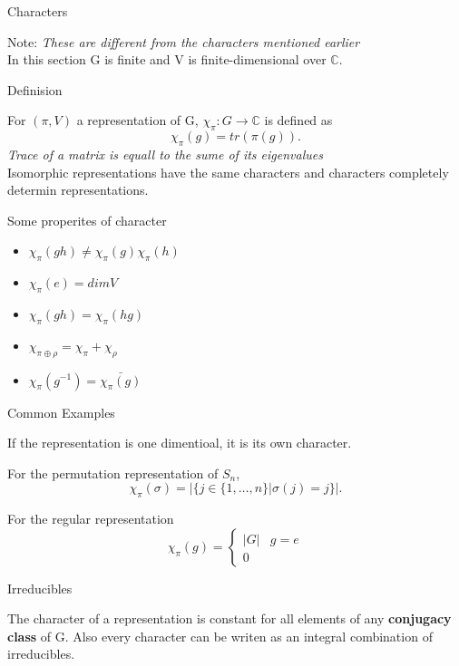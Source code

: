 \documentclass[12pt, letterpaper]{article}
\newcommand{\C}{\mathbb{C}}
\begin{document}
\begin{section}{Characters}

  Note: \emph{These are different from the characters mentioned earlier} \\
  In this section G is finite and V is finite-dimensional over \(\C\).

  \begin{subsection}{Definision}

    For \((\pi, V)\) a representation of G, \(\chi_{\pi}: G \to \C\) is defined
    as \[\chi_{\pi}(g) = tr(\pi(g)).\] \emph{Trace of a matrix is equall to the
      sume of its eigenvalues} \\
    Isomorphic representations have the same characters and characters
    completely determin representations.

    Some properites of character
    \begin{itemize}
      \item \(\chi_{\pi}(gh) \neq \chi_{\pi}(g) \chi_{\pi}(h)\)
      \item \(\chi_{\pi}(e) = dim V\)
      \item \(\chi_{\pi}(gh) = \chi_{\pi}(hg)\)
      \item \(\chi_{\pi \oplus \rho} = \chi_{\pi} + \chi_{\rho}\)
      \item \(\chi_{\pi}(g^{-1}) = \bar{\chi_{\pi}(g)}\)
    \end{itemize}

    \begin{subsubsection}{Common Examples}

      If the representation is one dimentioal, it is its own character.

      For the permutation representation of \(S_{n}\), \[\chi_{\pi}(\sigma) =
        |\{j \in \{1, \dots, n\} | \sigma(j) = j\}|.\]

      For the regular representation \[\chi_{\pi}(g) =
        \begin{cases}
          |G| & g = e \\
                 0
        \end{cases}
      \]

    \end{subsubsection}

  \end{subsection}

  \begin{subsection}{Irreducibles}

    The character of a representation is constant for all elements of any
    \textbf{conjugacy class} of G. Also every character can be writen as an
    integral combination of irreducibles.


\end{subsection}
\end{section}
\end{document}
